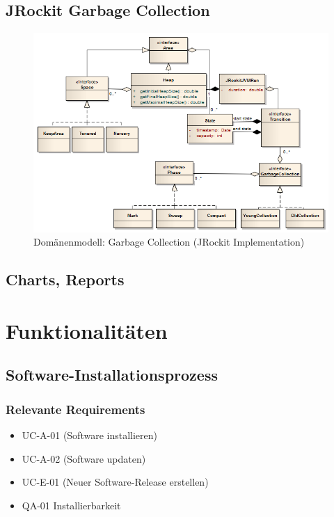 \subsection{JRockit Garbage Collection}
\begin{landscape}
 \begin{figure}[H]
  	\centering
        	\caption{Domänenmodell: Garbage Collection (JRockit Implementation)}
    	\includegraphics[width=19.5cm]{images/jrockit_extension_domain}
\end{figure}
\end{landscape}
\subsection{Charts, Reports}

\section{Funktionalitäten}
\subsection{Software-Installationsprozess}
\subsubsection{Relevante Requirements}
\begin{itemize}
	\item UC-A-01 (Software installieren)
	\item UC-A-02 (Software updaten)
	\item UC-E-01 (Neuer Software-Release erstellen)
	\item QA-01 Installierbarkeit
\end{itemize}


